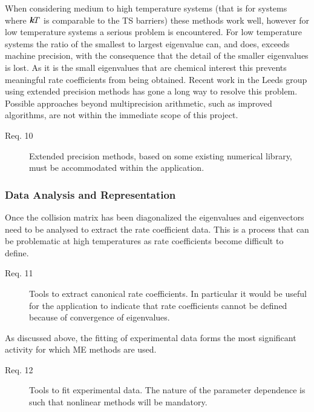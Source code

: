 When considering medium to high temperature systems (that is for systems where $\textbf{\em k}T$ is comparable to the TS barriers) these methods work well, however for low temperature systems a serious problem is encountered. For low temperature systems the ratio of the smallest to largest eigenvalue can, and does, exceeds machine precision, with the consequence that the detail of the smaller eigenvalues is lost. As it is the small eigenvalues that are chemical interest this prevents meaningful rate coefficients from being obtained. Recent work in the Leeds group using extended precision methods has gone a long way to resolve this problem. Possible approaches beyond multiprecision arithmetic, such as improved algorithms, are not within the immediate scope of this project. 

\begin{description}
\item[Req. 10]{ Extended precision methods, based on some existing numerical library, must be accommodated within the application.}
\end{description}

\subsubsection{Data Analysis and Representation
}\label{sec:DataAnalysisAndRepresentation
}

Once the collision matrix has been diagonalized the eigenvalues and eigenvectors need to be analysed to extract the rate coefficient data. This is a process that can be problematic at high temperatures as rate coefficients become difficult to define.


\begin{description}
\item[Req. 11]{Tools to extract canonical rate coefficients. In particular it would be useful for the application to indicate that rate coefficients cannot be defined because of convergence of eigenvalues.}
\end{description}

As discussed above, the fitting of experimental data forms the most significant activity for which ME methods are used.


\begin{description}
\item[Req. 12]{Tools to fit experimental data. The nature of the parameter dependence is such that nonlinear methods will be mandatory.}
\end{description}


